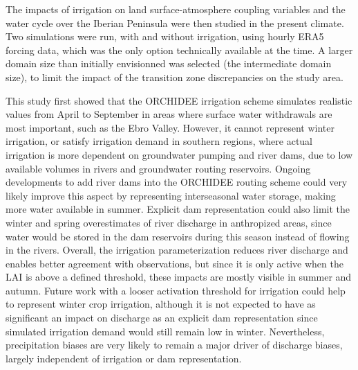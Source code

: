 \hfill

The impacts of irrigation on land surface-atmosphere coupling variables and the water cycle over the Iberian Peninsula were then studied in the present climate. Two simulations were run, with and without irrigation, using hourly ERA5 forcing data, which was the only option technically available at the time. A larger domain size than initially envisionned was selected (the intermediate domain size), to limit the impact of the transition zone discrepancies on the study area.

This study first showed that the ORCHIDEE irrigation scheme simulates realistic values from April to September in areas where surface water withdrawals are most important, such as the Ebro Valley. However, it cannot represent winter irrigation, or satisfy irrigation demand in southern regions, where actual irrigation is more dependent on groundwater pumping and river dams, due to low available volumes in rivers and groundwater routing reservoirs. Ongoing developments to add river dams into the ORCHIDEE routing scheme \citep{baratgin_modeling_2024} could very likely improve this aspect by representing interseasonal water storage, making more water available in summer.
Explicit dam representation could also limit the winter and spring overestimates of river discharge in anthropized areas, since water would be stored in the dam reservoirs during this season instead of flowing in the rivers. 
Overall, the irrigation parameterization reduces river discharge and enables better agreement with observations, but since it is only active when the LAI is above a defined threshold, these impacts are mostly visible in summer and autumn. Future work with a looser activation threshold for irrigation could help to represent winter crop irrigation, although it is not expected to have as significant an impact on discharge as an explicit dam representation since simulated irrigation demand would still remain low in winter. Nevertheless, precipitation biases are very likely to remain a major driver of discharge biases, largely independent of irrigation or dam representation.

